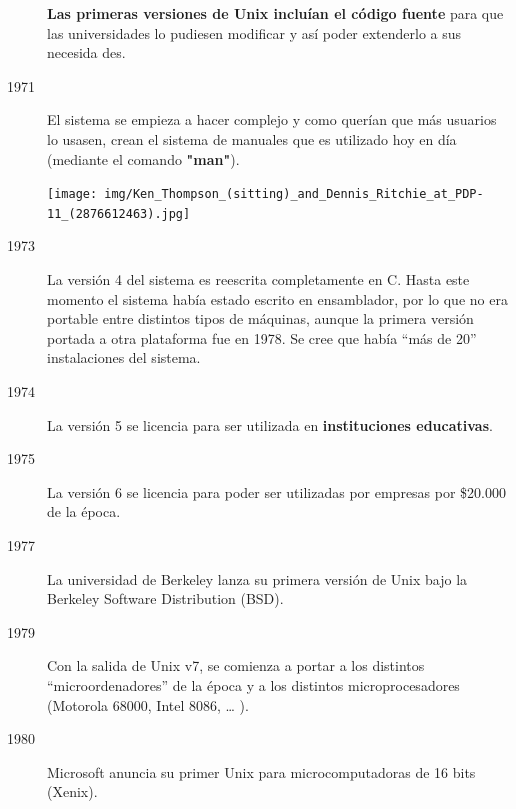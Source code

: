 \documentclass{../../../yukibook.cls/yukibook}
\begin{document}
\begin{description}
\textbf{Las primeras versiones de Unix incluían el código fuente} para que las universidades lo pudiesen modificar y así poder extenderlo a sus necesida des.


\item[1971]El sistema se empieza a hacer complejo y como querían que más usuarios lo usasen, crean el sistema de manuales que es utilizado hoy en día (mediante el comando \textbf{"man"}).

\begin{center}
  \texttt{[image: img/Ken\_Thompson\_(sitting)\_and\_Dennis\_Ritchie\_at\_PDP-11\_(2876612463).jpg]}
  \vspace{-10pt}\vspace{-13pt}
\end{center}


\item[1973]La versión 4 del sistema es reescrita completamente en C. Hasta este momento el sistema había estado escrito en ensamblador, por lo que no era portable entre distintos tipos de máquinas, aunque la primera versión portada a otra plataforma fue en 1978. Se cree que había “más de 20” instalaciones del sistema.

\item[1974]La versión 5 se licencia para ser utilizada en \textbf{instituciones educativas}.

\item[1975]La versión 6 se licencia para poder ser utilizadas por empresas por \$20.000 de la época.

\item[1977]La universidad de Berkeley lanza su primera versión de Unix bajo la Berkeley Software Distribution (BSD).

\item[1979]Con la salida de Unix v7, se comienza a portar a los distintos ``microordenadores'' de la época y a los distintos microprocesadores (Motorola 68000, Intel 8086, … ).

\item[1980]Microsoft anuncia su primer Unix para microcomputadoras de 16 bits (Xenix).
\end{description}
\end{document}
